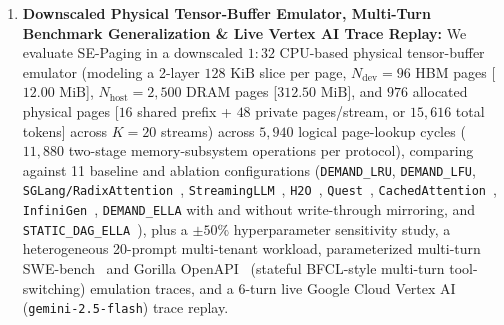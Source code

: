 \documentclass[conference,10pt]{IEEEtran}
\begin{document}
\begin{enumerate}
\begin{itemize}
        \item \textbf{Theorem 3 (Bounded Competitive Ratio):} Uses the competitive caching with predictions framework~\cite{lykouris2021competitive} on acyclic agentic execution graphs to establish expected competitive ratios of $\mathbb{E}[\mathcal{C}_{\text{ELLA}}^{\text{greedy}}] \le 1 + \mathcal{O}(\eta_{\text{tot}}/\text{OPT} + \mathcal{H}_{\max})$ under non-cascading trace-regular greedy eviction and $\mathbb{E}[\mathcal{C}_{\text{ELLA}}^{\text{marker}}] \le 2 + \mathcal{O}(\min(\sqrt{\mathbb{E}[\eta_{\ell_1}]/\text{OPT}}, \log N_{\text{dev}}))$ when paired with randomized Predictive Marker phases relative to offline Belady MIN~\cite{belady1966study}.
    \end{itemize}
    \item \textbf{Downscaled Physical Tensor-Buffer Emulator, Multi-Turn Benchmark Generalization \& Live Vertex AI Trace Replay:} We evaluate SE-Paging in a downscaled $1:32$ CPU-based physical tensor-buffer emulator (modeling a 2-layer $128\text{ KiB}$ slice per page, $N_{\text{dev}}=96$ HBM pages [$12.00\text{ MiB}$], $N_{\text{host}}=2{,}500$ DRAM pages [$312.50\text{ MiB}$], and $976$ allocated physical pages [$16$ shared prefix + $48$ private pages/stream, or $15{,}616$ total tokens] across $K=20$ streams) across $5{,}940$ logical page-lookup cycles ($11{,}880$ two-stage memory-subsystem operations per protocol), comparing against 11 baseline and ablation configurations (\texttt{DEMAND\_LRU}, \texttt{DEMAND\_LFU}, \texttt{SGLang/RadixAttention}~\cite{zheng2024sglang}, \texttt{StreamingLLM}~\cite{xiao2023efficient}, \texttt{H2O}~\cite{zhang2023h2o}, \texttt{Quest}~\cite{tang2024quest}, \texttt{CachedAttention}~\cite{gao2024cachedattention}, \texttt{InfiniGen}~\cite{lee2024infinigen}, \texttt{DEMAND\_ELLA} with and without write-through mirroring, and \texttt{STATIC\_DAG\_ELLA}~\cite{pan2025kvflow}), plus a $\pm 50\%$ hyperparameter sensitivity study, a heterogeneous 20-prompt multi-tenant workload, parameterized multi-turn SWE-bench~\cite{jimenez2024swebench} and Gorilla OpenAPI~\cite{patil2024gorilla} (stateful BFCL-style multi-turn tool-switching) emulation traces, and a 6-turn live Google Cloud Vertex AI (\texttt{gemini-2.5-flash}) trace replay.
\end{enumerate}
\end{document}
